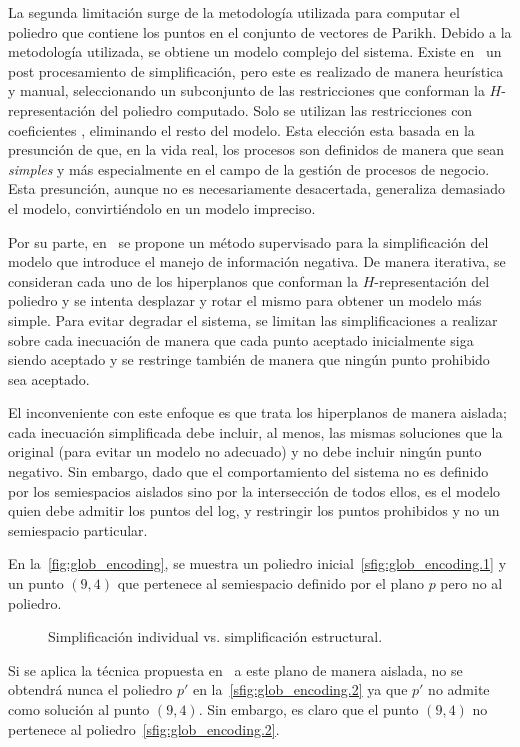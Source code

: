 La segunda limitación surge de la metodología utilizada para computar el poliedro que contiene los 
puntos en el conjunto de vectores de Parikh. Debido a la metodología utilizada, se obtiene un 
modelo complejo del sistema. Existe en~\cite{CarmonaC14} un post procesamiento de simplificación, pero este es
realizado de manera heurística y manual, seleccionando un subconjunto de las restricciones que conforman la
$H$-representación del poliedro computado. Solo se utilizan las restricciones con coeficientes , 
eliminando el resto del modelo. 
Esta elección esta basada en la presunción de que, en la vida real, los procesos son definidos de manera
que sean \textit{simples} y más especialmente en el campo de la gestión de procesos de negocio. Esta presunción,
aunque no es necesariamente desacertada, generaliza demasiado el modelo, convirtiéndolo en un modelo
impreciso.

Por su parte, en~\cite{LeonCB15} se propone un método supervisado para la simplificación del modelo que 
introduce el manejo de información negativa.
De manera iterativa, se consideran cada uno de los hiperplanos que conforman la $H$-representación del poliedro
y se intenta desplazar y rotar el mismo para obtener un modelo más simple.
Para evitar degradar el sistema, se limitan las simplificaciones a realizar sobre cada inecuación
de manera que cada punto aceptado inicialmente siga siendo aceptado y se restringe también
de manera que ningún punto prohibido sea aceptado.

El inconveniente con este enfoque es que trata los hiperplanos de manera aislada; cada inecuación
simplificada debe incluir, al menos, las mismas soluciones que la original (para evitar un modelo no adecuado) y no
debe incluir ningún punto negativo. Sin embargo, dado que el comportamiento del sistema no es definido por los 
semiespacios aislados sino por la intersección de todos ellos, es el modelo quien debe admitir los puntos del log,
y restringir los puntos prohibidos y no un semiespacio particular.

\begin{example}
    \label{ex:prob_gen}
    En la~\autoref{fig:glob_encoding}, se muestra un poliedro inicial~\autoref{sfig:glob_encoding.1} 
    y un punto $(9,4)$ que pertenece al semiespacio definido por el plano $p$ pero no al poliedro.

    \begin{figure}[H]
      \centering
      \hfill
      \caption{Simplificación individual vs. simplificación estructural.}
      \label{fig:glob_encoding}
    \end{figure}

    Si se aplica la técnica propuesta en~\cite{LeonCB15} a este plano de manera aislada,
    no se obtendrá nunca el poliedro $p'$ en la~\autoref{sfig:glob_encoding.2} ya que
    $p'$ no admite como solución al punto $(9,4)$. 
    Sin embargo, es claro que el punto $(9,4)$ no pertenece al poliedro~\autoref{sfig:glob_encoding.2}.
\end{example}

